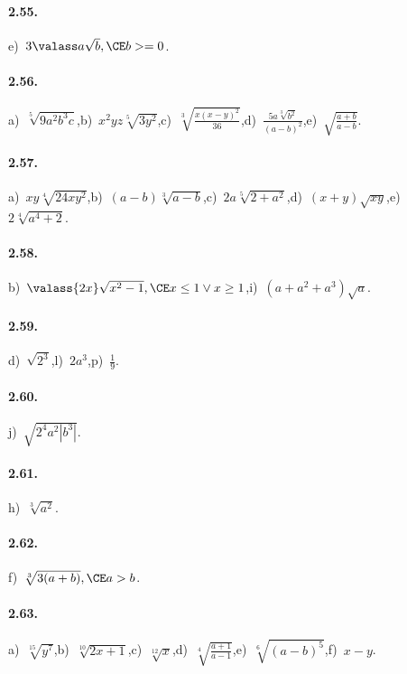 \paragraph{2.55.}
e)~$3\valass a\sqrt b, \CE b>=0$.

\paragraph{2.56.}
a)~$\sqrt[5]{9a^2b^3c}$,\quad b)~$x^2yz\sqrt[5]{3y^2}$,\quad c)~$\sqrt[3]{\frac{x(x-y)^2}{36}}$,\quad d)~$\frac{5a\sqrt[3]{b^2}}{(a-b)^2}$,\quad e)~$\sqrt{\frac{a+b}{a-b}}$.

\paragraph{2.57.}
a)~$xy\sqrt[4]{24xy^2}$,\quad b)~$(a-b)\sqrt[3]{a-b}$,\quad c)~$2a\sqrt[5]{2+a^2}$,\quad d)~$(x+y)\sqrt{xy}$,\quad e)~$2\sqrt[4]{a^4+2}$.

\paragraph{2.58.}
b)~$\valass{2x}\sqrt{x^2-1}, \CE x\le 1\vee x\ge 1$,\quad i)~$(a+a^2+a^3)\sqrt a$.

\paragraph{2.59.}
d)~$\sqrt{2^3}$,\quad l)~$2a^3$,\quad p)~$\frac 1 9$.

\paragraph{2.60.}
j)~$\sqrt{2^4a^2\left|b^3\right|}$.

\paragraph{2.61.}
h)~$\sqrt[3]{a^2}$.

\paragraph{2.62.}
f)~$\sqrt[3]{3(a+b)}, \CE a>b$.

\paragraph{2.63.}
a)~$\sqrt[15]{y^7}$,\quad b)~$\sqrt[10]{2x+1}$,\quad c)~$\sqrt[12]{x}$,\quad d)~$\sqrt[4]{\frac{a+1}{a-1}}$,\quad e)~$\sqrt[6]{(a-b)^5}$,\quad f)~$x-y$.

